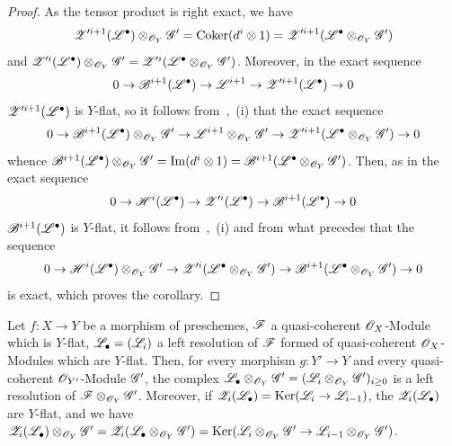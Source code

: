 \begin{proof}
As the tensor product is right exact, we have
\[
  \mathscr Z'^{i+1}(\mathscr{L}^\bullet)\otimes_{\mathscr{O}_Y}\mathscr{G}' = \operatorname{Coker}(d^i\otimes 1) = \mathscr Z'^{i+1}(\mathscr{L}^\bullet\otimes_{\mathscr{O}_Y}\mathscr{G}')
\]
and $\mathscr Z'^{i}(\mathscr{L}^\bullet)\otimes_{\mathscr{O}_Y}\mathscr{G}' = \mathscr Z'^{i}(\mathscr{L}^\bullet\otimes_{\mathscr{O}_Y}\mathscr{G}')$.
Moreover, in the exact sequence
\[
  0\to\mathscr{B}^{i+1}(\mathscr{L}^\bullet)\to\mathscr{L}^{i+1}\to\mathscr Z'^{i+1}(\mathscr{L}^\bullet)\to 0
\]
$\mathscr Z'^{i+1}(\mathscr{L}^\bullet)$ is $Y$-flat, so it follows from~,~(i) that the exact sequence
\[
  0\to\mathscr{B}^{i+1}(\mathscr{L}^\bullet)\otimes_{\mathscr{O}_Y}\mathscr{G}'\to\mathscr{L}^{i+1}\otimes_{\mathscr{O}_Y}\mathscr{G}'\to\mathscr Z'^{i+1}(\mathscr{L}^\bullet\otimes_{\mathscr{O}_Y}\mathscr{G}')\to 0
\]
whence $\mathscr{B}^{i+1}(\mathscr{L}^\bullet)\otimes_{\mathscr{O}_Y}\mathscr{G}'=\operatorname{Im}(d^i\otimes 1)=\mathscr{B}^{i+1}(\mathscr{L}^\bullet\otimes_{\mathscr{O}_Y}\mathscr{G}')$.
Then, as in the exact sequence
\[
  0\to\mathscr{H}^i(\mathscr{L}^\bullet)\to\mathscr Z'^i(\mathscr{L}^\bullet)\to\mathscr{B}^{i+1}(\mathscr{L}^\bullet)\to 0
\]
$\mathscr{B}^{i+1}(\mathscr{L}^\bullet)$ is $Y$-flat, it follows from~,~(i) and from what precedes that the sequence
\[
  0\to\mathscr{H}^i(\mathscr{L}^\bullet)\otimes_{\mathscr{O}_Y}\mathscr{G}'\to\mathscr Z'^i(\mathscr{L}^\bullet\otimes_{\mathscr{O}_Y}\mathscr{G}')\to\mathscr{B}^{i+1}(\mathscr{L}^\bullet\otimes_{\mathscr{O}_Y}\mathscr{G}')\to 0
\]
is exact, which proves the corollary.
\end{proof}

\begin{corollary}[2.1.10]
\label{IV.2.1.10}
Let $f:X\to Y$ be a morphism of preschemes, $\mathscr{F}$ a quasi-coherent $\mathscr{O}_X$-Module which is $Y$-flat, $\mathscr{L}_\bullet=(\mathscr{L}_i)$ a left resolution of $\mathscr{F}$ formed of quasi-coherent $\mathscr{O}_X$-Modules which are $Y$-flat.
Then, for every morphism $g:Y'\to Y$ and every quasi-coherent $\mathscr{O}_{Y'}$-Module $\mathscr{G}'$, the complex $\mathscr{L}_\bullet\otimes_{\mathscr{O}_Y}\mathscr{G}'=(\mathscr{L}_i\otimes_{\mathscr{O}_Y}\mathscr{G}')_{i\geq 0}$ is a left resolution of $\mathscr{F}\otimes_{\mathscr{O}_Y}\mathscr{G}'$.
Moreover, if $\mathscr{Z}_i(\mathscr{L}_\bullet)=\operatorname{Ker}(\mathscr{L}_i\to\mathscr{L}_{i-1})$, the $\mathscr{Z}_i(\mathscr{L}_\bullet)$ are $Y$-flat, and we have $\mathscr{Z}_i(\mathscr{L}_\bullet)\otimes_{\mathscr{O}_Y}\mathscr{G}'=\mathscr{Z}_i(\mathscr{L}_\bullet\otimes_{\mathscr{O}_Y}\mathscr{G}')=\operatorname{Ker}(\mathscr{L}_i\otimes_{\mathscr{O}_Y}\mathscr{G}'\to\mathscr{L}_{i-1}\otimes_{\mathscr{O}_Y}\mathscr{G}')$.
\end{corollary}

